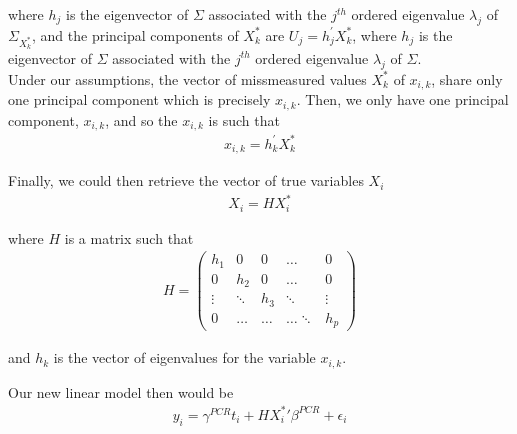\documentclass[12pt]{article}
\begin{document}
where $h_j$ is the eigenvector of $\Sigma$ associated with the $j^{t h}$ ordered eigenvalue $\lambda_{j}$ of $\Sigma_{X^*_k}$, and the principal components of $X^*_k$ are $U_{j}=h_{j}^{\prime} X^*_k$, where $h_{j}$ is the eigenvector of $\Sigma$ associated with the $j^{t h}$ ordered eigenvalue $\lambda_{j}$ of $\Sigma$.\\

Under our assumptions, the vector of missmeasured values $X^*_k$ of $x_{i,k}$, share only one principal component which is precisely $x_{i,k}$. Then, we only have one principal component, $x_{i,k}$, and so the $x_{i,k}$ is such that
\begin{align}
    x_{i,k}=h_{k}^{\prime} X^*_k
\end{align}

Finally, we could then retrieve the vector of true variables $X_i$
\begin{align}
    X_i=HX^*_i
\end{align}

where $H$ is a matrix such that
\begin{align*}
    H=\left(\begin{array}{ccccc}
h_1 & 0 & 0 & \dots & 0 \\
0 & h_2 & 0 & \dots & 0 \\
\vdots & \ddots & h_3 & \ddots & \vdots \\
0 & \dots & \dots & \dots \ddots & h_p
\end{array}\right)
\end{align*}

and $h_k$ is the vector of eigenvalues for the variable $x_{i,k}$.

Our new linear model then would be
\begin{align}
    y_i = \gamma^{PCR} t_i + H{X^*_i}'\beta^{PCR} + \epsilon_i
\end{align}
\end{document}
